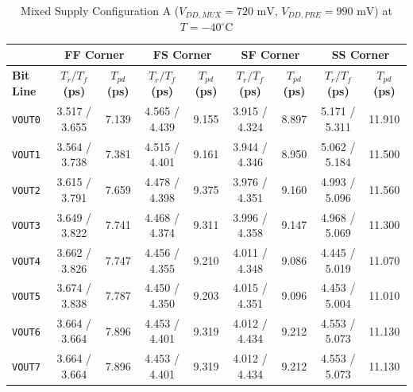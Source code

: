 \begin{table}[H]
    \centering
    \renewcommand{\arraystretch}{1.3}
    \setlength{\tabcolsep}{4pt}
    \small
    \begin{tabular}{|l|cc|cc|cc|cc|}
        \hline
        & \multicolumn{2}{c|}{\textbf{FF Corner}} & \multicolumn{2}{c|}{\textbf{FS Corner}} & \multicolumn{2}{c|}{\textbf{SF Corner}} & \multicolumn{2}{c|}{\textbf{SS Corner}} \\ \hline
        \textbf{Bit Line} & \textbf{$T_r / T_f$ (ps)} & \textbf{$T_{pd}$ (ps)} & \textbf{$T_r / T_f$ (ps)} & \textbf{$T_{pd}$ (ps)} & \textbf{$T_r / T_f$ (ps)} & \textbf{$T_{pd}$ (ps)} & \textbf{$T_r / T_f$ (ps)} & \textbf{$T_{pd}$ (ps)} \\ \hline
        \texttt{VOUT0} & 3.517 / 3.655 & 7.139 & 4.565 / 4.439 & 9.155 & 3.915 / 4.324 & 8.897 & 5.171 / 5.311 & 11.910 \\ 
        \texttt{VOUT1} & 3.564 / 3.738 & 7.381 & 4.515 / 4.401 & 9.161 & 3.944 / 4.346 & 8.950 & 5.062 / 5.184 & 11.500 \\ 
        \texttt{VOUT2} & 3.615 / 3.791 & 7.659 & 4.478 / 4.398 & 9.375 & 3.976 / 4.351 & 9.160 & 4.993 / 5.096 & 11.560 \\ 
        \texttt{VOUT3} & 3.649 / 3.822 & 7.741 & 4.468 / 4.374 & 9.311 & 3.996 / 4.358 & 9.147 & 4.968 / 5.069 & 11.300 \\ 
        \texttt{VOUT4} & 3.662 / 3.826 & 7.747 & 4.456 / 4.355 & 9.210 & 4.011 / 4.348 & 9.086 & 4.445 / 5.019 & 11.070 \\ 
        \texttt{VOUT5} & 3.674 / 3.838 & 7.787 & 4.450 / 4.350 & 9.203 & 4.015 / 4.351 & 9.096 & 4.453 / 5.004 & 11.010 \\ 
        \texttt{VOUT6} & 3.664 / 3.664 & 7.896 & 4.453 / 4.401 & 9.319 & 4.012 / 4.434 & 9.212 & 4.553 / 5.073 & 11.130 \\ 
        \texttt{VOUT7} & 3.664 / 3.664 & 7.896 & 4.453 / 4.401 & 9.319 & 4.012 / 4.434 & 9.212 & 4.553 / 5.073 & 11.130 \\ \hline
    \end{tabular}
    \vspace{2mm}
    \caption{Mixed Supply Configuration A ($V_{DD,MUX} = 720\text{ mV}$, $V_{DD,PRE} = 990\text{ mV}$) at $T = -40^{\circ}\text{C}$}
    \label{tab:asym_a_40}
\end{table}

